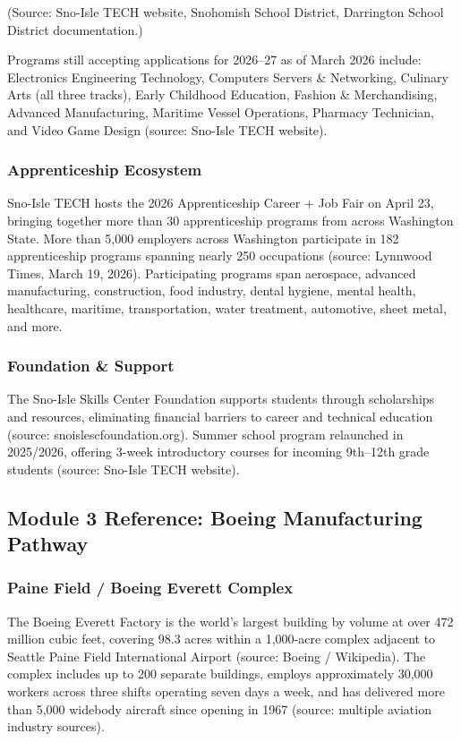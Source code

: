 \documentclass[11pt,letterpaper]{article}
\begin{document}
(Source: Sno-Isle TECH website, Snohomish School District, Darrington School District documentation.)

Programs still accepting applications for 2026--27 as of March 2026 include: Electronics Engineering Technology, Computers Servers \& Networking, Culinary Arts (all three tracks), Early Childhood Education, Fashion \& Merchandising, Advanced Manufacturing, Maritime Vessel Operations, Pharmacy Technician, and Video Game Design (source: Sno-Isle TECH website).

\subsubsection{Apprenticeship Ecosystem}

Sno-Isle TECH hosts the 2026 Apprenticeship Career + Job Fair on April 23, bringing together more than 30 apprenticeship programs from across Washington State. More than 5,000 employers across Washington participate in 182 apprenticeship programs spanning nearly 250 occupations (source: Lynnwood Times, March 19, 2026). Participating programs span aerospace, advanced manufacturing, construction, food industry, dental hygiene, mental health, healthcare, maritime, transportation, water treatment, automotive, sheet metal, and more.

\subsubsection{Foundation \& Support}

The Sno-Isle Skills Center Foundation supports students through scholarships and resources, eliminating financial barriers to career and technical education (source: snoislescfoundation.org). Summer school program relaunched in 2025/2026, offering 3-week introductory courses for incoming 9th--12th grade students (source: Sno-Isle TECH website).

\subsection{Module 3 Reference: Boeing Manufacturing Pathway}

\subsubsection{Paine Field / Boeing Everett Complex}

The Boeing Everett Factory is the world's largest building by volume at over 472 million cubic feet, covering 98.3 acres within a 1,000-acre complex adjacent to Seattle Paine Field International Airport (source: Boeing / Wikipedia). The complex includes up to 200 separate buildings, employs approximately 30,000 workers across three shifts operating seven days a week, and has delivered more than 5,000 widebody aircraft since opening in 1967 (source: multiple aviation industry sources).
\end{document}
